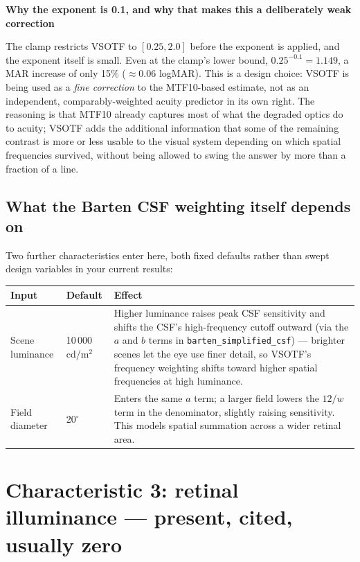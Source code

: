 \documentclass[11pt]{report}
\newenvironment{keybox}[1]%
{\par\vspace{6pt}\begin{lrbox}{\kbsave}\begin{minipage}{0.88\textwidth}%
{\bfseries\color{hbblue}#1}\par\vspace{4pt}\ignorespaces}%
{\end{minipage}\end{lrbox}%
\begin{center}\setlength{\fboxrule}{1.2pt}\setlength{\fboxsep}{7pt}%
\fcolorbox{hbblue}{boxgrey}{\usebox{\kbsave}}\end{center}\vspace{6pt}\par}
\begin{document}
\begin{keybox}{Why the exponent is 0.1, and why that makes this a deliberately weak correction}
The clamp restricts VSOTF to $[0.25, 2.0]$ before the exponent is applied, and the exponent itself is
small. Even at the clamp's lower bound, $0.25^{-0.1} = 1.149$, a MAR increase of only 15\%
($\approx 0.06$ logMAR). This is a design choice: VSOTF is being used as a \emph{fine correction} to
the MTF10-based estimate, not as an independent, comparably-weighted acuity predictor in its own
right. The reasoning is that MTF10 already captures most of what the degraded optics do to acuity;
VSOTF adds the additional information that some of the remaining contrast is more or less usable to
the visual system depending on which spatial frequencies survived, without being allowed to swing the
answer by more than a fraction of a line.
\end{keybox}

\section{What the Barten CSF weighting itself depends on}

Two further characteristics enter here, both fixed defaults rather than swept design variables in
your current results:

\begin{longtable}{p{3.5cm}p{2.5cm}p{7.5cm}}
\toprule
\textbf{Input} & \textbf{Default} & \textbf{Effect} \\
\midrule
\endhead
Scene luminance & 10\,000\,cd/m$^2$ & Higher luminance raises peak CSF sensitivity and shifts the
CSF's high-frequency cutoff outward (via the $a$ and $b$ terms in \texttt{barten\_simplified\_csf}) ---
brighter scenes let the eye use finer detail, so VSOTF's frequency weighting shifts toward higher
spatial frequencies at high luminance. \\
Field diameter & 20$^\circ$ & Enters the same $a$ term; a larger field lowers the $12/w$ term in the
denominator, slightly raising sensitivity. This models spatial summation across a wider retinal area.
\\
\bottomrule
\end{longtable}

\chapter{Characteristic 3: retinal illuminance --- present, cited, usually zero}
\end{document}
